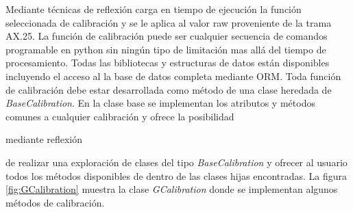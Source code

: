 \documentclass[twoside,twocolumn]{article}
\begin{document}
Mediante técnicas de reflexión carga en tiempo de ejecución la función seleccionada de calibración y se le aplica al valor raw proveniente de la trama AX.25. La función de calibración puede ser cualquier secuencia de comandos programable en python sin ningún tipo de limitación mas allá del tiempo de procesamiento. Todas las bibliotecas y estructuras de datos están disponibles incluyendo el acceso al la base de datos completa mediante ORM. Toda función de calibración debe estar desarrollada como método de una clase heredada de \textit{BaseCalibration}. En la clase base se implementan los atributos y métodos comunes a cualquier calibración y ofrece la posibilidad{ mediante reflexión{ de realizar una exploración de clases del tipo \textit{BaseCalibration} y ofrecer al usuario todos los métodos disponibles de dentro de las clases hijas encontradas. La figura \ref{fig:GCalibration} muestra la clase \textit{GCalibration} donde se implementan algunos métodos de calibración.



}}
\end{document}
